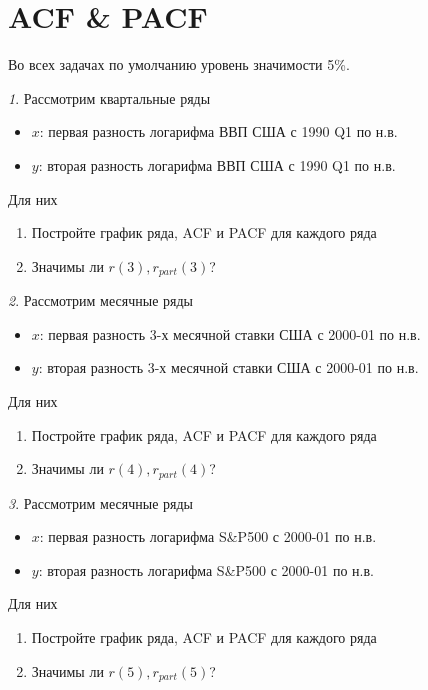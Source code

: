 \documentclass[12pt]{article}
\theoremstyle{remark}
\newtheorem{exercise}{}[subsection]
\begin{document}
\section{ACF \& PACF}

Во всех задачах по умолчанию уровень значимости 5\%.

\begin{exercise}
Рассмотрим квартальные ряды
\begin{itemize}
	\item \(x\): первая разность логарифма ВВП США с 1990 Q1 по н.в.
	\item \(y\): вторая разность логарифма ВВП США с 1990 Q1 по н.в.
\end{itemize}
Для них
\begin{enumerate}
	\item Постройте график ряда, ACF и PACF для каждого ряда
	\item Значимы ли \(r(3),r_{part}(3)\)?
\end{enumerate}
\end{exercise}

\begin{exercise}
Рассмотрим месячные ряды
\begin{itemize}
	\item \(x\): первая разность 3-х месячной ставки США с 2000-01 по
	н.в.
	\item \(y\): вторая разность 3-х месячной ставки США с 2000-01 по
	н.в.
\end{itemize}
Для них
\begin{enumerate}
	\item Постройте график ряда, ACF и PACF для каждого ряда
	\item Значимы ли \(r(4),r_{part}(4)\)?
\end{enumerate}
\end{exercise}

\begin{exercise}
Рассмотрим месячные ряды
\begin{itemize}
	\item \(x\): первая разность логарифма S\&P500 с 2000-01 по
	н.в.
	\item \(y\): вторая разность логарифма S\&P500 с 2000-01 по
	н.в.
\end{itemize}
Для них
\begin{enumerate}
	\item Постройте график ряда, ACF и PACF для каждого ряда
	\item Значимы ли \(r(5),r_{part}(5)\)?
\end{enumerate}
\end{exercise}
\end{document}
